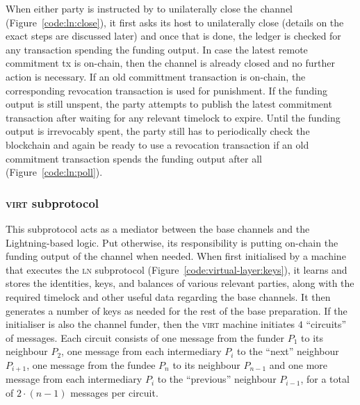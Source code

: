   When either party is instructed by \environment to unilaterally close the channel
  (Figure~\ref{code:ln:close}), it first asks its host to unilaterally close (details on the
  exact steps are discussed later) and once that is done, the ledger is checked
  for any transaction spending the funding output. In case the latest remote
  commitment tx is on-chain, then the channel is already closed and no further
  action is necessary. If an old committment transaction is on-chain, the
  corresponding revocation transaction is used for punishment. If the funding
  output is still unspent, the party attempts to publish the latest commitment
  transaction after waiting for any relevant timelock to expire. Until the
  funding output is irrevocably spent, the party still has to periodically check
  the blockchain and again be ready to use a revocation transaction if an old
  commitment transaction spends the funding output after all
  (Figure~\ref{code:ln:poll}).

  \subsubsection{\textsc{virt} subprotocol}
  \label{construction:virt}
  This subprotocol acts as a mediator between the base channels and the
  Lightning-based logic. Put otherwise, its responsibility is putting on-chain
  the funding output of the channel when needed. When first initialised by a
  machine that executes the \textsc{ln} subprotocol
  (Figure~\ref{code:virtual-layer:keys}), it learns and stores the identities,
  keys, and balances of various relevant parties, along with the required
  timelock and other useful data regarding the base channels. It then generates
  a number of keys as needed for the rest of the base preparation. If the
  initialiser is also the channel funder, then the \textsc{virt} machine
  initiates $4$ ``circuits'' of messages. Each circuit consists of one message
  from the funder $P_1$ to its neighbour $P_2$, one message from each
  intermediary $P_i$ to the ``next'' neighbour $P_{i+1}$, one message from the
  fundee $P_n$ to its neighbour $P_{n-1}$ and one more message from each
  intermediary $P_i$ to the ``previous'' neighbour $P_{i-1}$, for a total of
  $2\cdot(n-1)$ messages per circuit.

